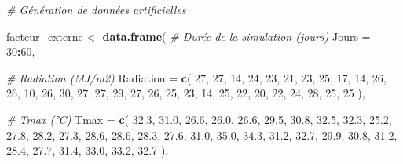 \documentclass[
]{article}
\newenvironment{Shaded}{\begin{snugshade}}{\end{snugshade}}
\newcommand{\AttributeTok}[1]{\textcolor[rgb]{0.13,0.29,0.53}{#1}}
\newcommand{\CommentTok}[1]{\textcolor[rgb]{0.56,0.35,0.01}{\textit{#1}}}
\newcommand{\DecValTok}[1]{\textcolor[rgb]{0.00,0.00,0.81}{#1}}
\newcommand{\FloatTok}[1]{\textcolor[rgb]{0.00,0.00,0.81}{#1}}
\newcommand{\FunctionTok}[1]{\textcolor[rgb]{0.13,0.29,0.53}{\textbf{#1}}}
\newcommand{\NormalTok}[1]{#1}
\newcommand{\OtherTok}[1]{\textcolor[rgb]{0.56,0.35,0.01}{#1}}
\newcommand{\SpecialCharTok}[1]{\textcolor[rgb]{0.81,0.36,0.00}{\textbf{#1}}}
\begin{document}
\begin{Shaded}
\begin{Highlighting}[]
\CommentTok{\# Génération de données artificielles}

\NormalTok{facteur\_externe }\OtherTok{\textless{}{-}} \FunctionTok{data.frame}\NormalTok{(}
  \CommentTok{\# Durée de la simulation (jours)}
  \AttributeTok{Jours =} \DecValTok{30}\SpecialCharTok{:}\DecValTok{60}\NormalTok{, }
  
  \CommentTok{\# Radiation (MJ/m2)}
  \AttributeTok{Radiation =} \FunctionTok{c}\NormalTok{( }
    \DecValTok{27}\NormalTok{, }\DecValTok{27}\NormalTok{, }\DecValTok{14}\NormalTok{, }\DecValTok{24}\NormalTok{, }\DecValTok{23}\NormalTok{, }\DecValTok{21}\NormalTok{, }
    \DecValTok{23}\NormalTok{, }\DecValTok{25}\NormalTok{, }\DecValTok{17}\NormalTok{, }\DecValTok{14}\NormalTok{, }\DecValTok{26}\NormalTok{, }\DecValTok{26}\NormalTok{, }
    \DecValTok{10}\NormalTok{, }\DecValTok{26}\NormalTok{, }\DecValTok{30}\NormalTok{, }\DecValTok{27}\NormalTok{, }\DecValTok{27}\NormalTok{, }\DecValTok{29}\NormalTok{, }
    \DecValTok{27}\NormalTok{, }\DecValTok{26}\NormalTok{, }\DecValTok{25}\NormalTok{, }\DecValTok{23}\NormalTok{, }\DecValTok{14}\NormalTok{, }\DecValTok{25}\NormalTok{, }
    \DecValTok{22}\NormalTok{, }\DecValTok{20}\NormalTok{, }\DecValTok{22}\NormalTok{, }\DecValTok{24}\NormalTok{, }\DecValTok{28}\NormalTok{, }\DecValTok{25}\NormalTok{, }\DecValTok{25}
\NormalTok{  ),}
  
  \CommentTok{\# Tmax (°C)}
  \AttributeTok{Tmax =} \FunctionTok{c}\NormalTok{( }
    \FloatTok{32.3}\NormalTok{, }\FloatTok{31.0}\NormalTok{, }\FloatTok{26.6}\NormalTok{, }\FloatTok{26.0}\NormalTok{, }\FloatTok{26.6}\NormalTok{, }\FloatTok{29.5}\NormalTok{, }
    \FloatTok{30.8}\NormalTok{, }\FloatTok{32.5}\NormalTok{, }\FloatTok{32.3}\NormalTok{, }\FloatTok{25.2}\NormalTok{, }\FloatTok{27.8}\NormalTok{, }\FloatTok{28.2}\NormalTok{, }
    \FloatTok{27.3}\NormalTok{, }\FloatTok{28.6}\NormalTok{, }\FloatTok{28.6}\NormalTok{, }\FloatTok{28.3}\NormalTok{, }\FloatTok{27.6}\NormalTok{, }\FloatTok{31.0}\NormalTok{, }
    \FloatTok{35.0}\NormalTok{, }\FloatTok{34.3}\NormalTok{, }\FloatTok{31.2}\NormalTok{, }\FloatTok{32.7}\NormalTok{, }\FloatTok{29.9}\NormalTok{, }\FloatTok{30.8}\NormalTok{, }
    \FloatTok{31.2}\NormalTok{, }\FloatTok{28.4}\NormalTok{, }\FloatTok{27.7}\NormalTok{, }\FloatTok{31.4}\NormalTok{, }\FloatTok{33.0}\NormalTok{, }\FloatTok{33.2}\NormalTok{, }\FloatTok{32.7}
\NormalTok{  ),}
  

\end{Highlighting}
\end{Shaded}
\end{document}
